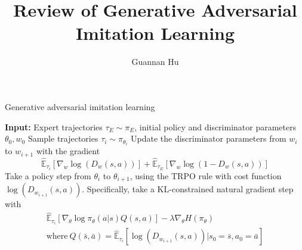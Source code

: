 \documentclass[12pt,a4paper]{article}
\begin{document}
\title{Review of Generative Adversarial Imitation Learning}
\author{Guannan Hu}
\maketitle

\begin{algorithm}
\caption{Generative adversarial imitation learning}
\begin{algorithmic}[1]
	\State \textbf{Input:} Expert trajectories $\tau_{E} \sim \pi_{E}$, initial policy and discriminator parameters $\theta_{0}, w_{0}$
		\State Sample trajectories $\tau_{i} \sim \pi_{\theta_{i}}$
		\State Update the discriminator parameters from $w_i$ to $w_{i+1}$ with the gradient
			\begin{equation}
			\hat{\mathbb{E}}_{\tau_{i}}[\nabla_{w}\log(D_{w}(s,a))] + \hat{\mathbb{E}}_{\tau_{E}}[\nabla_{w}\log(1-D_{w}(s,a))]
			\end{equation}
		\State Take a policy step from $\theta_{i}$ to $\theta_{i+1}$, using the TRPO rule with cost function $\log(D_{w_{i+1}}(s,a))$. Specifically, take a KL-constrained natural gradient step with 
		\begin{equation}
		\begin{array}{l}
		\hat{\mathbb{E}}_{\tau_{i}}[\nabla_{\theta}\log\pi_{\theta}(a|s)Q(s,a)] - \lambda\nabla_{\theta}H(\pi_{\theta}) \\
		\text{where}\ Q(\bar{s}, \bar{a}) = \hat{\mathbb{E}}_{\tau_{i}}[\log(D_{w_{i+1}}(s,a))|s_{0}=\bar{s}, a_{0}=\bar{a}]
		
		\end{array}
		\end{equation}
	\EndFor
\end{algorithmic}
\end{algorithm}


%


\end{document}
